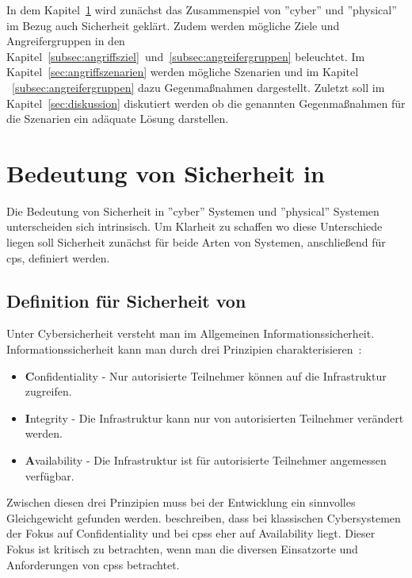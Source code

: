 \documentclass[final,bibliography=totocnumbered]{include/sikseminar}
\newcommand{\fb}[1]{\dofb#1}
\newcommand{\dofb}[1]{\textbf{#1}\nobreak\hspace{0pt}}
\begin{document}
In dem Kapitel~\ref{sec:bedeutung-sicherheit} wird zunächst das Zusammenspiel von ''cyber'' und ''physical'' im Bezug auch Sicherheit geklärt.
Zudem werden mögliche Ziele und Angreifergruppen in den Kapitel~\ref{subsec:angriffsziel}~und~\ref{subsec:angreifergruppen} beleuchtet.
Im Kapitel~\ref{sec:angriffszenarien} werden mögliche Szenarien und im Kapitel ~\ref{subsec:angreifergruppen} dazu Gegenmaßnahmen dargestellt.
Zuletzt soll im Kapitel~\ref{sec:diskussion} diskutiert werden ob die genannten Gegenmaßnahmen  für die Szenarien ein adäquate Lösung darstellen.



\section{Bedeutung von Sicherheit in }\label{sec:bedeutung-sicherheit}
Die Bedeutung von Sicherheit in ''cyber'' Systemen und ''physical'' Systemen unterscheiden sich intrinsisch.
Um Klarheit zu schaffen wo diese Unterschiede liegen soll Sicherheit zunächst für beide Arten von Systemen, anschließend für \gls{cps}, definiert werden.

\subsection{Definition für Sicherheit von }\label{subsec:definition}
Unter Cybersicherheit versteht man im Allgemeinen Informationssicherheit.
Informationssicherheit kann man durch drei Prinzipien charakterisieren~\cite[,S.~2]{Cherdantseva2013,SFJ2017}:
\begin{itemize}[noitemsep,nolistsep]
\item \fb{Confidentiality} - Nur autorisierte Teilnehmer können auf die Infrastruktur zugreifen.
\item \fb{Integrity} - Die Infrastruktur kann nur von autorisierten Teilnehmer verändert werden.
\item \fb{Availability} - Die Infrastruktur ist für autorisierte Teilnehmer angemessen verfügbar.
\end{itemize}
Zwischen diesen drei Prinzipien muss bei der Entwicklung ein sinnvolles Gleichgewicht gefunden werden.
\citeauthor{GK16} beschreiben, dass bei klassischen Cybersystemen der Fokus auf Confidentiality und bei \glspl{cps} eher auf Availability liegt.
Dieser Fokus ist kritisch zu betrachten, wenn man die diversen Einsatzorte und Anforderungen von \glspl{cps} betrachtet.
\end{document}
